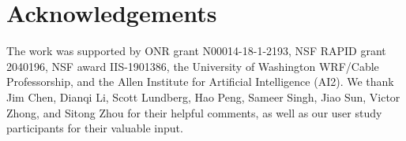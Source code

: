 \section*{Acknowledgements}
The work was supported by ONR grant N00014-18-1-2193, NSF RAPID grant 2040196, NSF award IIS-1901386, the University of Washington WRF/Cable Professorship, and the Allen Institute for Artificial Intelligence (AI2).
We thank 
Jim Chen, 
Dianqi Li,
Scott Lundberg, 
Hao Peng, 
Sameer Singh,
Jiao Sun,
Victor Zhong,
and Sitong Zhou for their helpful comments, as well as our user study participants for their valuable input.
